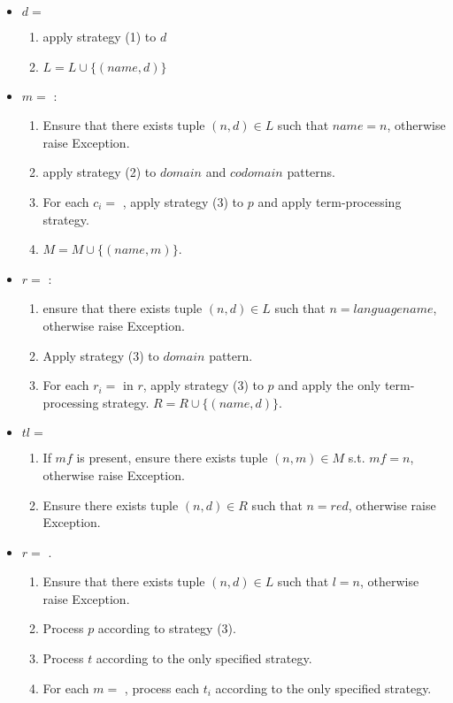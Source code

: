\begin{itemize}
\item
$d =$ \DefineLanguage 
	\begin{enumerate}
		\item apply strategy (1) to $d$ 
		\item $L = L \cup \{ (name, d) \}$
	\end{enumerate}

\item $m=$ \DefineMetafunction: 
	\begin{enumerate}
	\item Ensure that there exists tuple $(n, d) \in L$ such that $name=n$, otherwise raise Exception.
	\item apply strategy (2) to $domain$ and $codomain$ patterns.
	\item For each $c_i=$ \MetafunctionCase, apply strategy (3) to $p$ and apply term-processing strategy. 
	\item $M = M \cup \{ (name, m) \}$. 
	\end{enumerate}

\item $r=$ \DefineReductionRelation: 
\begin{enumerate}
\item ensure that there exists tuple $(n, d) \in L$ such that $n=languagename$, otherwise raise Exception.
\item Apply strategy (3) to $domain$ pattern. 
\item For each $r_i=$ \ReductionCase in $r$, apply strategy (3) to $p$ and apply the only term-processing strategy. $R = R \cup \{ (name, d) \}$.
\end{enumerate}

\item $tl=$ \ReadFromStdinAndApplyReductionRelation
\begin{enumerate} 
\item If $mf$ is present, ensure there exists tuple $(n, m) \in M$ s.t. $mf=n$, otherwise raise Exception.
\item Ensure there exists tuple $(n, d) \in R$ such that $n=red$, otherwise raise Exception.
\end{enumerate}


\item 
$r=$ \RedexMatchAssertEqual. 
	\begin{enumerate}
	\item Ensure that there exists tuple $(n, d) \in L$ such that $l=n$, otherwise raise Exception.
	\item Process $p$ according to strategy (3). 
	\item Process $t$ according to the only specified strategy.
	\item For each $m=$ \Match, process each $t_i$ according to the only specified strategy.
	\end{enumerate}


\end{itemize}
